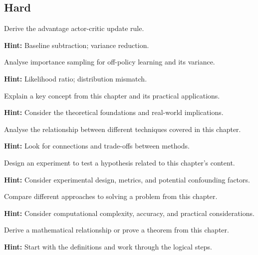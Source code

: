 \subsection*{Hard}

\begin{problem}
Derive the advantage actor-critic update rule.

\textbf{Hint:} Baseline subtraction; variance reduction.
\end{problem}

\begin{problem}
Analyse importance sampling for off-policy learning and its variance.

\textbf{Hint:} Likelihood ratio; distribution mismatch.
\end{problem}


\begin{problem}
Explain a key concept from this chapter and its practical applications.

\textbf{Hint:} Consider the theoretical foundations and real-world implications.
\end{problem}

\begin{problem}
Analyse the relationship between different techniques covered in this chapter.

\textbf{Hint:} Look for connections and trade-offs between methods.
\end{problem}

\begin{problem}
Design an experiment to test a hypothesis related to this chapter's content.

\textbf{Hint:} Consider experimental design, metrics, and potential confounding factors.
\end{problem}

\begin{problem}
Compare different approaches to solving a problem from this chapter.

\textbf{Hint:} Consider computational complexity, accuracy, and practical considerations.
\end{problem}

\begin{problem}
Derive a mathematical relationship or prove a theorem from this chapter.

\textbf{Hint:} Start with the definitions and work through the logical steps.
\end{problem}

